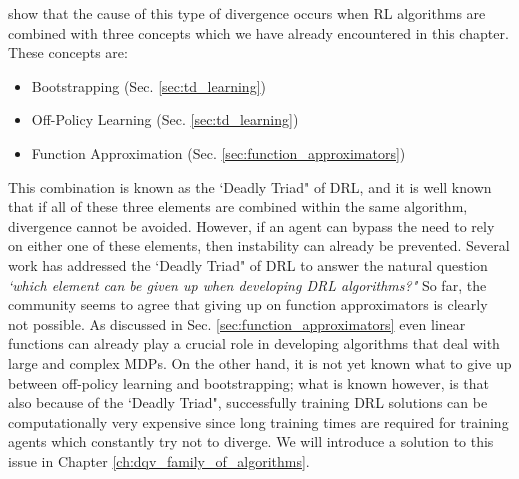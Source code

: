 \citet{sutton2018reinforcement} show that the cause of this type of divergence occurs when RL algorithms are combined with three concepts which we have already encountered in this chapter. These concepts are:
\begin{itemize}
	\item Bootstrapping (Sec. \ref{sec:td_learning})
	\item Off-Policy Learning (Sec. \ref{sec:td_learning})
	\item Function Approximation (Sec. \ref{sec:function_approximators})
\end{itemize}
This combination is known as the `Deadly Triad" of DRL, and it is well known that if all of these three elements are combined within the same algorithm, divergence cannot be avoided. However, if an agent can bypass the need to rely on either one of these elements, then instability can already be prevented. Several work has addressed the `Deadly Triad" of DRL \cite{van2018deep_triad,hernandez2019understanding,fedus2020revisiting} to answer the natural question \textit{`which element can be given up when developing DRL algorithms?"} So far, the community seems to agree that giving up on function approximators is clearly not possible. As discussed in Sec. \ref{sec:function_approximators} even linear functions can already play a crucial role in developing algorithms that deal with large and complex MDPs. On the other hand, it is not yet known what to give up between off-policy learning and bootstrapping; what is known however, is that also because of the `Deadly Triad", successfully training DRL solutions can be computationally very expensive since long training times are required for training agents which constantly try not to diverge. We will introduce a solution to this issue in Chapter \ref{ch:dqv_family_of_algorithms}.


